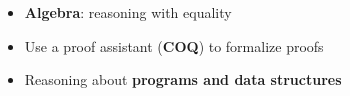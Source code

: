 \begin{itemize}
\item  \textbf{Algebra}: reasoning with equality

\end{itemize}



\begin{itemize}
\item  Use a proof assistant (\textbf{COQ}) to formalize proofs

\end{itemize}



\begin{itemize}
\item  Reasoning about \textbf{programs and data structures}

\end{itemize}
\begin{coqdoccode}
\end{coqdoccode}
